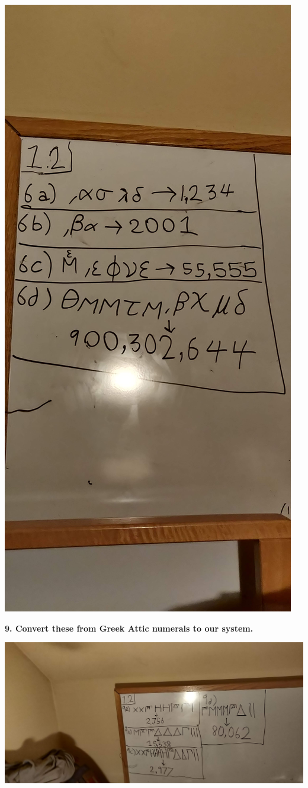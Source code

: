 \documentclass[12pt]{article}
\begin{document}
\includegraphics[angle=270, scale=0.08]{6.jpg}

\pagebreak
\textbf{9. Convert these from Greek Attic numerals to our system.}
\medskip

\includegraphics[scale=0.08]{9.jpg}
\end{document}
